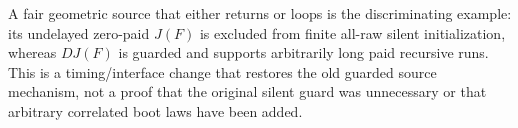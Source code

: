 \documentclass[11pt]{article}
\begin{document}
A fair geometric source that either returns or loops is the discriminating
example: its undelayed zero-paid $J(F)$ is excluded from finite all-raw silent
initialization, whereas $D J(F)$ is guarded and supports arbitrarily long
paid recursive runs. This is a timing/interface change that restores the
old guarded source mechanism, not a proof that the original silent guard
was unnecessary or that arbitrary correlated boot laws have been added.
\end{document}
